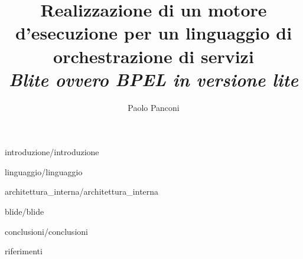 \documentclass[a4paper,12pt]{book}
\begin{document}
\hyphenation{}
\sloppy

\title{\textsf{ \textbf{Realizzazione di un motore d'esecuzione per un
linguaggio di orchestrazione di servizi} \\ 
\em \large Blite ovvero BPEL in versione lite}\\ } 
\author{Paolo Panconi}

\maketitle


\tableofcontents

\listoffigures
\listoftables

%
%


%
{introduzione/introduzione}


%
{linguaggio/linguaggio}


%
{architettura_interna/architettura_interna}


%
{blide/blide}


%
{conclusioni/conclusioni}


%
{riferimenti}
\end{document}
